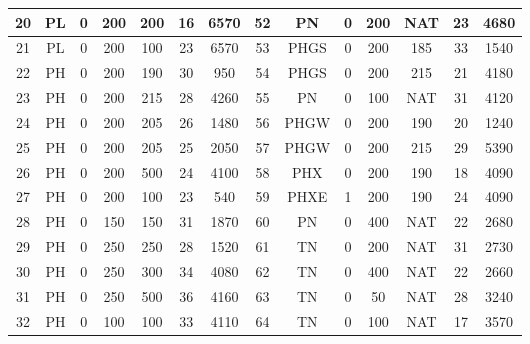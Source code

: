 \begin{table}[p]
\begin{tabular}{|c|c|c|c|c|c|c||c|c|c|c|c|c|c|}
20   & PL      & 0     & 200        & 200       & 16         & 6570           &   52   & PN      & 0     & 200        & NAT       & 23         & 4680        \\ \hline
21   & PL      & 0     & 200        & 100       & 23         & 6570           &   53   & PHGS    & 0     & 200        & 185       & 33         & 1540        \\ \hline
22   & PH      & 0     & 200        & 190       & 30         & 950            &   54   & PHGS    & 0     & 200        & 215       & 21         & 4180        \\ \hline
23   & PH      & 0     & 200        & 215       & 28         & 4260           &   55   & PN      & 0     & 100        & NAT       & 31         & 4120        \\ \hline
24   & PH      & 0     & 200        & 205       & 26         & 1480           &   56   & PHGW    & 0     & 200        & 190       & 20         & 1240        \\ \hline
25   & PH      & 0     & 200        & 205       & 25         & 2050           &   57   & PHGW    & 0     & 200        & 215       & 29         & 5390        \\ \hline
26   & PH      & 0     & 200        & 500       & 24         & 4100           &   58   & PHX     & 0     & 200        & 190       & 18         & 4090        \\ \hline
27   & PH      & 0     & 200        & 100       & 23         & 540            &   59   & PHXE    & 1     & 200        & 190       & 24         & 4090        \\ \hline
28   & PH      & 0     & 150        & 150       & 31         & 1870           &   60   & PN      & 0     & 400        & NAT       & 22         & 2680        \\ \hline
29   & PH      & 0     & 250        & 250       & 28         & 1520           &   61   & TN      & 0     & 200        & NAT       & 31         & 2730        \\ \hline
30   & PH      & 0     & 250        & 300       & 34         & 4080           &   62   & TN      & 0     & 400        & NAT       & 22         & 2660        \\ \hline
31   & PH      & 0     & 250        & 500       & 36         & 4160           &   63   & TN      & 0     & 50         & NAT       & 28         & 3240        \\ \hline
32   & PH      & 0     & 100        & 100       & 33         & 4110           &   64   & TN      & 0     & 100        & NAT       & 17         & 3570        \\ \hline

\end{tabular}
\end{table}
